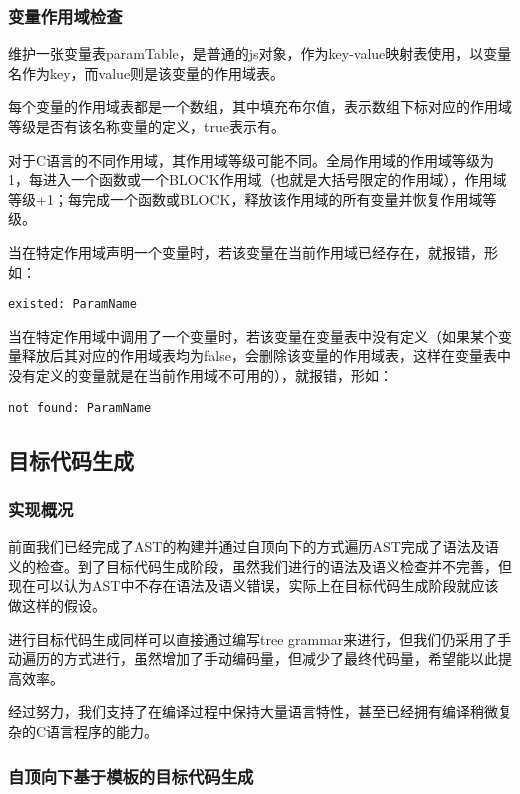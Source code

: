 \documentclass[a4paper]{article}
\begin{document}
\begin{CJK*}{UTF8}{gbsn}
    \subsubsection{变量作用域检查}
    维护一张变量表paramTable，是普通的js对象，作为key-value映射表使用，以变量名作为key，而value则是该变量的作用域表。
    \par 每个变量的作用域表都是一个数组，其中填充布尔值，表示数组下标对应的作用域等级是否有该名称变量的定义，true表示有。
    \par 对于C语言的不同作用域，其作用域等级可能不同。全局作用域的作用域等级为1，每进入一个函数或一个BLOCK作用域（也就是大括号限定的作用域），作用域等级+1；每完成一个函数或BLOCK，释放该作用域的所有变量并恢复作用域等级。
    \par 当在特定作用域声明一个变量时，若该变量在当前作用域已经存在，就报错，形如：
    \begin{verbatim}
existed: ParamName
    \end{verbatim}
    \par 当在特定作用域中调用了一个变量时，若该变量在变量表中没有定义（如果某个变量释放后其对应的作用域表均为false，会删除该变量的作用域表，这样在变量表中没有定义的变量就是在当前作用域不可用的），就报错，形如：
    \begin{verbatim}
not found: ParamName
    \end{verbatim}

    \subsection{目标代码生成}
    \subsubsection{实现概况}
    前面我们已经完成了AST的构建并通过自顶向下的方式遍历AST完成了语法及语义的检查。到了目标代码生成阶段，虽然我们进行的语法及语义检查并不完善，但现在可以认为AST中不存在语法及语义错误，实际上在目标代码生成阶段就应该做这样的假设。
    \par 进行目标代码生成同样可以直接通过编写tree grammar来进行，但我们仍采用了手动遍历的方式进行，虽然增加了手动编码量，但减少了最终代码量，希望能以此提高效率。
    \par 经过努力，我们支持了在编译过程中保持大量语言特性，甚至已经拥有编译稍微复杂的C语言程序的能力。

    \subsubsection{自顶向下基于模板的目标代码生成}


\end{CJK*}
\end{document}
